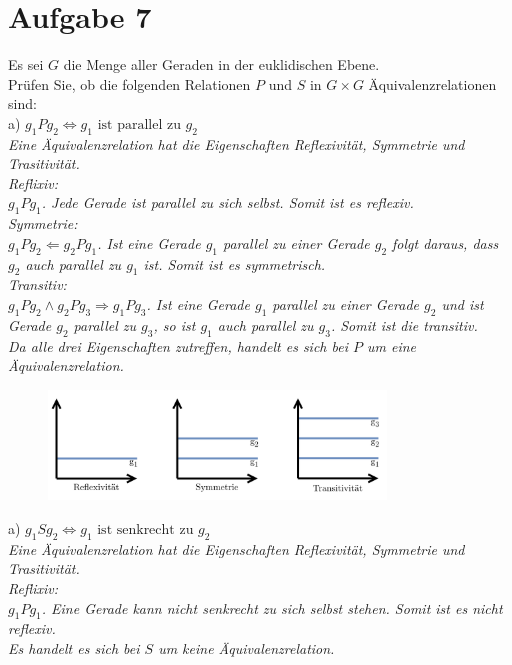 \section*{Aufgabe 7}

Es sei $G$ die Menge aller Geraden in der euklidischen Ebene.\\
Prüfen Sie, ob die folgenden Relationen $P$ und $S$ in $G \times G$ Äquivalenzrelationen sind:\\

a) $g_1 P g_2 \Leftrightarrow g_1 \text{ ist parallel zu } g_2$\\

\textit{Eine Äquivalenzrelation hat die Eigenschaften Reflexivität, Symmetrie und Trasitivität.}\\

\textit{Reflixiv:}\\
\textit{$g_1Pg_1$. Jede Gerade ist parallel zu sich selbst. Somit ist es reflexiv.}\\

\textit{Symmetrie:}\\
\textit{$g_1Pg_2 \Leftarrow g_2Pg_1$. Ist eine Gerade $g_1$ parallel zu einer Gerade $g_2$ folgt daraus, dass $g_2$ auch parallel zu $g_1$ ist. Somit ist es symmetrisch.}\\

\textit{Transitiv:}\\
\textit{$g_1Pg_2 \land g_2Pg_3 \Rightarrow g_1Pg_3$. Ist eine Gerade $g_1$ parallel zu einer Gerade $g_2$ und ist Gerade $g_2$ parallel zu $g_3$, so ist $g_1$ auch parallel zu $g_3$. Somit ist die transitiv.}\\

\textit{Da alle drei Eigenschaften zutreffen, handelt es sich bei $P$ um eine Äquivalenzrelation.}

\begin{figure}[h]
\centering
\includegraphics[width=0.8\textwidth]{graphics/parallel.png}
\end{figure}

a) $g_1 S g_2 \Leftrightarrow g_1 \text{ ist senkrecht zu } g_2$\\

\textit{Eine Äquivalenzrelation hat die Eigenschaften Reflexivität, Symmetrie und Trasitivität.}\\

\textit{Reflixiv:}\\
\textit{$g_1Pg_1$. Eine Gerade kann nicht senkrecht zu sich selbst stehen. Somit ist es nicht reflexiv.}\\

\textit{Es handelt es sich bei $S$ um keine Äquivalenzrelation.}

